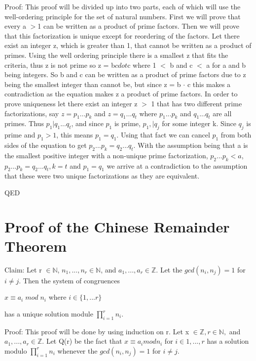 \documentclass{article}
\newcommand\tab[1][1cm]{\hspace*{#1}}
\begin{document}
Proof: This proof will be divided up into two parts, each of which will use the well-ordering principle for the set of natural numbers. First we will prove that every a $>$1 can be written as a product of prime factors. Then we will prove that this factorization is unique except for reordering of the factors. Let there exist an integer z, which is greater than 1, that cannot be written as a product of primes. Using the well ordering principle there is a smallest z that fits the criteria, thus z is not prime so z = b$cdot$c where 1 $<$ b and c $<$ a for a and b being integers. So b and c can be written as a product of prime factors due to z being the smallest integer than cannot be, but since z = b $\cdot$ c this makes a contradiction as the equation makes z a product of prime factors. In order to prove uniqueness let there exist an integer z $>$ 1 that has two different prime factorizations, say $z = p_1 ... p_k$  and $z = q_1 ... q_t$ where $p_1 ... p_k$ and $q_1 ... q_t$ are all primes. Thus $p_1 \vert q_1...q_t$, and since $p_1$ is prime, $p_1, \vert q_j$ for some integer k. Since $q_j$ is prime and $p_1 >1$, this means $p_1 = q_1$. Using that fact we can cancel $p_1$ from both sides of the equation to get $p_2...p_k = q_2...q_t$. With the assumption being that a is the smallest positive integer with a non-unique prime factorization, $p_2...p_k < a$, $p_2...p_k = q_2... q_t, k = t$ and $p_1 = q_1$ we arrive at a contradiction to the assumption that these were two unique factorizations as they are equivalent.

QED 


\pagebreak
\section{Proof of the Chinese Remainder Theorem}

Claim: Let r $\in \mathbb{N}$, $n_1, ... , n_r  \in \mathbb{N}$, and $a_1,...,a_r \in \mathbb{Z}$. Let the $gcd(n_i,n_j) =1$ for $i \neq j$. Then the system of congruences

\tab\tab\tab\tab $x \equiv a_i \; mod \; n_i$ where $i \in \{1,...r\}$

has a unique solution module $\prod_{i=1}^{r} n_i $.

Proof: This proof will be done by using induction on r. Let x $\in \mathbb{Z}, r\in \mathbb{N},$ and $a_1,..., a_r \in \mathbb{Z}$. Let Q(r) be the fact that $x \equiv a_i mod n_i$ for $i \in {1,...,r}$ has a solution modulo  $\prod_{i=1}^{r} n_i $ whenever the $gcd(n_i,n_j) =1$ for $i \neq j$.
\end{document}
